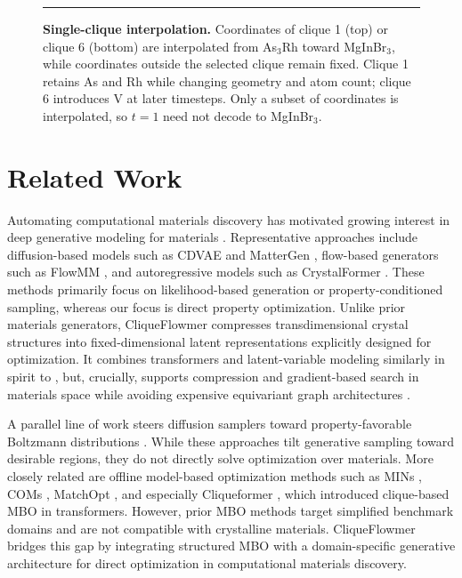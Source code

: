 \documentclass{article}
\theoremstyle{plain}
\theoremstyle{definition}
\theoremstyle{remark}
\begin{document}
\begin{figure}[t]
\vspace{\platepad}\par
{\color{plate}\rule{\textwidth}{\platerule}}\par

\vspace{-2pt}
\caption{\textbf{Single-clique interpolation.} Coordinates of clique 1 (top) or clique 6 (bottom) are interpolated from As$_3$Rh toward MgInBr$_3$, while coordinates outside the selected clique remain fixed. Clique 1 retains As and Rh while changing geometry and atom count; clique 6 introduces V at later timesteps. Only a subset of coordinates is interpolated, so $t=1$ need not decode to MgInBr$_3$.}
\label{fig:two-row-clique}
\vspace{-10pt}
\end{figure}

\vspace{-8pt}
\section{Related Work}
\vspace{-8pt}
Automating computational materials discovery has motivated growing interest in deep generative modeling for materials \citep{jain2013commentary}. 
Representative approaches include diffusion-based models such as CDVAE \citep{xie2021crystal} and MatterGen \citep{zeni2023mattergen}, flow-based generators such as FlowMM \citep{miller2024flowmm}, and autoregressive models such as CrystalFormer \citep{cao2025space}. 
These methods primarily focus on likelihood-based generation or property-conditioned sampling, whereas our focus is direct property optimization. Unlike prior materials generators, CliqueFlowmer compresses transdimensional crystal structures into fixed-dimensional latent representations explicitly designed for optimization. It combines transformers and latent-variable modeling similarly in spirit to \citet{joshi2025all}, but, crucially, supports compression and gradient-based search in materials space while avoiding expensive equivariant graph architectures \citep{li2025e2former}.

A parallel line of work steers diffusion samplers toward property-favorable Boltzmann distributions \citep{li2408derivative,uehara2024bridging,tan2025scalable,liu2025adjoint}. While these approaches tilt generative sampling toward desirable regions, they do not directly solve optimization over materials.
More closely related are offline model-based optimization methods such as MINs \citep{kumar2020model}, COMs \citep{trabucco2021conservative}, MatchOpt \citep{hoang2025learning}, and especially Cliqueformer \citep{kuba2024cliqueformer}, which introduced clique-based MBO in transformers. However, prior MBO methods target simplified benchmark domains and are not compatible with crystalline materials. CliqueFlowmer bridges this gap by integrating structured MBO with a domain-specific generative architecture for direct optimization in computational materials discovery.
\end{document}
